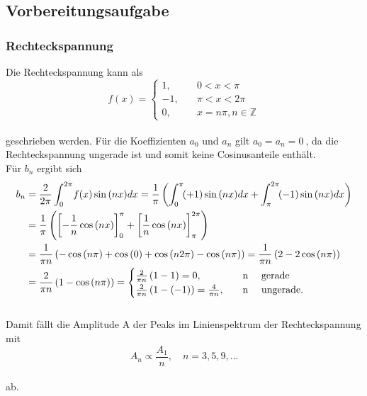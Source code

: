 \subsection{Vorbereitungsaufgabe}
\subsubsection{Rechteckspannung}
Die Rechteckspannung kann als
\begin{equation*}
  f(x)=
    \begin{cases}
      1,   \quad &0<x<\pi\\
      -1,  \quad &\pi<x<2\pi\\
      0,   \quad &x=n\pi, n \in \mathbb{Z}
    \end{cases}
\end{equation*}
\\geschrieben werden.
Für die Koeffizienten $a_{0}$ und $a_{n}$ gilt $a_{0}=a_{n}= \SI{0}{}$, da die Rechteckspannung ungerade ist und somit keine Cosinusanteile enthält.
\\Für $b_{n}$ ergibt sich
\begin{align*}
  b_{n}
  &=\frac{2}{2 \pi}  \int_{0}^{2 \pi} \! f(x) \sin{(nx)} dx
   =\frac{1}{\pi} \left( \int_{0}^{\pi} \! (+1) \sin{(nx)} dx + \int_{\pi}^{2\pi} \! (-1) \sin{(nx)} dx \right)\\
  &=\frac{1}{\pi} \left( \left[-\frac{1}{n} \cos{(nx)} \right]_{0}^{\pi} + \left[ \frac{1}{n} \cos{(nx)} \right]_{\pi}^{2\pi} \right)\\
  &=\frac{1}{ \pi n} \left( -\cos{(n\pi)} + \cos{(0)} + \cos{(n 2\pi)} - \cos{(n\pi)}\right)
   =\frac{1}{ \pi n} \left( 2-2\cos{(n\pi)} \right)\\
  &=\frac{2}{ \pi n} \left( 1-\cos{(n\pi)} \right)
  =\begin{cases}
    \frac{2}{ \pi n} \left( 1-1 \right)                 = 0,                \quad &\text{n  \quad gerade}\\
    \frac{2}{ \pi n} \left( 1- \left(-1 \right) \right) = \frac{4}{\pi n},  \quad &\text{n  \quad ungerade.}\\
  \end{cases}
\end{align*}
\\Damit fällt die Amplitude A der Peaks im Linienspektrum der Rechteckspannung mit
\begin{equation}
  A_{n} \propto \frac{A_{1}}{n}, \quad n=3, 5, 9, ...
\end{equation}
\\ab.


